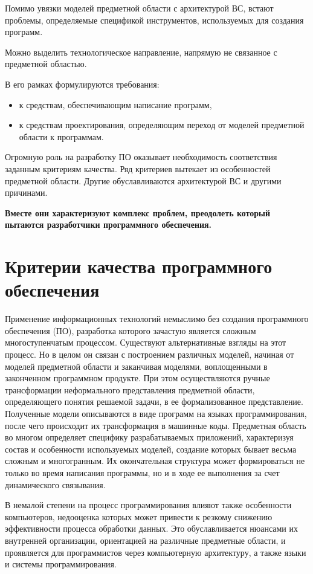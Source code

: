 Помимо увязки моделей предметной области с архитектурой ВС, встают проблемы, определяемые спецификой инструментов, используемых для создания программ.

Можно выделить технологическое направление, напрямую не связанное с предметной областью.

В его рамках формулируются требования:

\begin{itemize}
    \item к средствам, обеспечивающим написание программ,
    \item к средствам проектирования, определяющим переход от моделей предметной области к программам.
\end{itemize}

Огромную роль на разработку ПО оказывает необходимость соответствия заданным критериям качества.
Ряд критериев вытекает из особенностей предметной области. Другие обуславливаются архитектурой ВС и другими причинами.

\textbf{Вместе они характеризуют комплекс проблем, преодолеть который пытаются разработчики программного обеспечения.}

\section{Критерии качества программного обеспечения}

Применение информационных технологий немыслимо без создания программного обеспечения (ПО), разработка которого зачастую является сложным многоступенчатым процессом. Существуют альтернативные взгляды на этот процесс. Но в целом он связан с построением различных моделей, начиная от моделей предметной области и заканчивая моделями, воплощенными в законченном программном продукте. При этом осуществляются ручные трансформации неформального представления предметной области, определяющего понятия решаемой задачи, в ее формализованное представление. Полученные модели описываются в виде программ на языках программирования, после чего происходит их трансформация в машинные коды. Предметная область во многом определяет специфику разрабатываемых приложений, характеризуя состав и особенности используемых моделей, создание которых бывает весьма сложным и многогранным. Их окончательная структура может формироваться не только во время написания программы, но и в ходе ее выполнения за счет динамического связывания.

В немалой степени на процесс программирования влияют также особенности компьютеров, недооценка которых может привести к резкому снижению эффективности процесса обработки данных. Это обуславливается нюансами их внутренней организации, ориентацией на различные предметные области, и проявляется для программистов через компьютерную архитектуру, а также языки и системы программирования.

